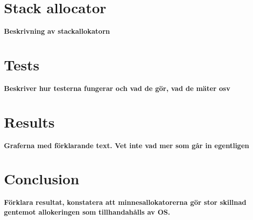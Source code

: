 \documentclass{article}
\begin{document}
\section{Stack allocator}
\textbf{\large Beskrivning av stackallokatorn}

\section{Tests}
\textbf{\large Beskriver hur testerna fungerar och vad de gör, vad de mäter osv}

\section{Results}
\textbf{\large Graferna med förklarande text. Vet inte vad mer som går in egentligen}

\section{Conclusion}
\textbf{\large Förklara resultat, konstatera att minnesallokatorerna gör stor skillnad gentemot allokeringen som tillhandahålls av OS.}
\end{document}
